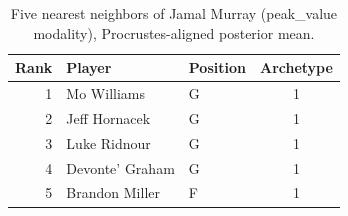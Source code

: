 \begin{table}[htbp]
  \centering\small
  \begin{tabular}{rllc}
    \toprule
    Rank & Player & Position & Archetype \\
    \midrule
    1 & Mo Williams & G & 1 \\
    2 & Jeff Hornacek & G & 1 \\
    3 & Luke Ridnour & G & 1 \\
    4 & Devonte' Graham & G & 1 \\
    5 & Brandon Miller & F & 1 \\
    \bottomrule
  \end{tabular}
  \caption{Five nearest neighbors of Jamal Murray (peak_value modality), Procrustes-aligned posterior mean.}
  \label{tab:Jamal_Murray_neighbors_peak_value}
\end{table}

